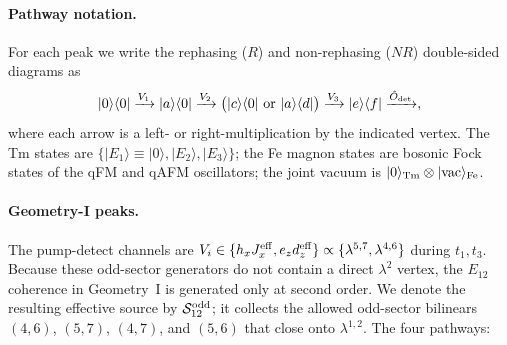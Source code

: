 \documentclass[reprint,amsmath,amssymb,aps,prb,longbibliography]{revtex4-2}
\begin{document}
\paragraph{Pathway notation.} For each peak we write the rephasing
($R$) and non-rephasing ($NR$) double-sided diagrams as
\begin{equation}
|0\rangle\langle 0|\xrightarrow{V_1}|a\rangle\langle 0|\xrightarrow{V_2}\bigl(|c\rangle\langle 0|\text{ or }|a\rangle\langle d|\bigr)\xrightarrow{V_3}|e\rangle\langle f|\xrightarrow{\hat O_{\rm det}},
\label{eq:Rdiag}
\end{equation}
where each arrow is a left- or right-multiplication by the indicated
vertex. The Tm states are $\{|E_1\rangle\!\equiv\!|0\rangle,|E_2\rangle,|E_3\rangle\}$;
the Fe magnon states are bosonic Fock states of the qFM and qAFM
oscillators; the joint vacuum is $|0\rangle_{\rm Tm}\otimes|{\rm vac}\rangle_{\rm Fe}$.

\paragraph{Geometry-I peaks.} The pump-detect channels are
$V_i\in\{h_x J_x^{\rm eff}, e_z d_z^{\rm eff}\}\propto\{\lambda^{5,7},\lambda^{4,6}\}$
during $t_1,t_3$. Because these odd-sector generators do not contain a
direct $\lambda^2$ vertex, the $E_{12}$ coherence in Geometry~I is
generated only at second order. We denote the resulting effective source by
$\mathcal S_{12}^{\rm odd}$; it collects the allowed odd-sector bilinears
$(4,6)$, $(5,7)$, $(4,7)$, and $(5,6)$ that close onto $\lambda^{1,2}$.
The four pathways:
\end{document}
